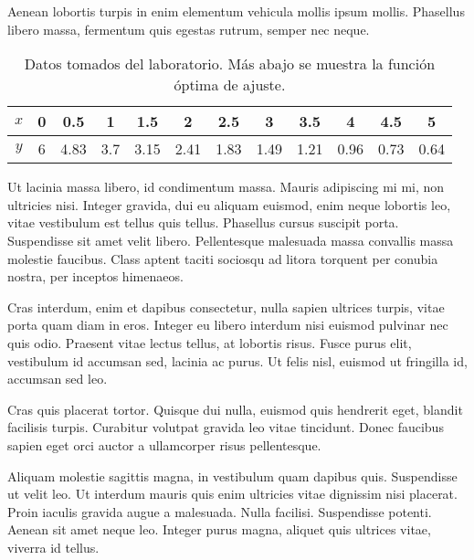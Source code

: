\documentclass[12pt,a4paper]{report}
\begin{document}
Aenean lobortis turpis in enim elementum vehicula mollis ipsum mollis. Phasellus libero massa, fermentum quis egestas rutrum, semper nec neque.



\begin{table}[!b]
\centering
\vspace*{10pt}
\begin{tabular}{c | *{11}c}
$x$ & 0   & 0.5     & 1    & 1.5    & 2      & 2.5   &  3     & 3.5   & 4     & 4.5   & 5 \\
\hline
$y$ & 6   & 4.83   & 3.7 & 3.15  & 2.41 & 1.83 & 1.49 & 1.21 & 0.96 & 0.73 & 0.64 
\end{tabular}
\caption{Datos tomados del laboratorio. Más abajo se muestra la función óptima de ajuste.}
\vspace*{10pt}
\end{table}



Ut lacinia massa libero, id condimentum massa. Mauris adipiscing mi mi, non ultricies nisi. Integer gravida, dui eu aliquam euismod, enim neque lobortis leo, vitae vestibulum est tellus quis tellus. Phasellus cursus suscipit porta. Suspendisse sit amet velit libero. Pellentesque malesuada massa convallis massa molestie faucibus. Class aptent taciti sociosqu ad litora torquent per conubia nostra, per inceptos himenaeos. 

Cras interdum, enim et dapibus consectetur, nulla sapien ultrices turpis, vitae porta quam diam in eros. Integer eu libero interdum nisi euismod pulvinar nec quis odio. Praesent vitae lectus tellus, at lobortis risus. Fusce purus elit, vestibulum id accumsan sed, lacinia ac purus. Ut felis nisl, euismod ut fringilla id, accumsan sed leo. 

Cras quis placerat tortor. Quisque dui nulla, euismod quis hendrerit eget, blandit facilisis turpis. Curabitur volutpat gravida leo vitae tincidunt. Donec faucibus sapien eget orci auctor a ullamcorper risus pellentesque.

Aliquam molestie sagittis magna, in vestibulum quam dapibus quis. Suspendisse ut velit leo. Ut interdum mauris quis enim ultricies vitae dignissim nisi placerat. Proin iaculis gravida augue a malesuada. Nulla facilisi. Suspendisse potenti. Aenean sit amet neque leo. Integer purus magna, aliquet quis ultrices vitae, viverra id tellus. 
\end{document}
